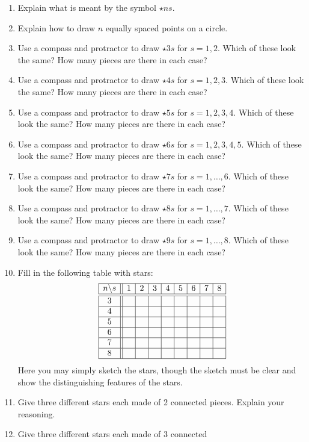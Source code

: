 \problems
\begin{enumerate}
\item Explain what is meant by the symbol $\star{n}{s}$.
\item Explain how to draw $n$ equally spaced points on a circle.
\item Use a compass and protractor to draw $\star{3}{s}$ for $s =
  1,2$. Which of these look the same?  How many pieces are there in
  each case?
\item Use a compass and protractor to draw $\star{4}{s}$ for $s =
  1,2,3$. Which of these look the same? How many pieces are there in
  each case?
\item Use a compass and protractor to draw $\star{5}{s}$ for $s =
  1,2,3,4$. Which of these look the same? How many pieces are there in
  each case?
\item Use a compass and protractor to draw $\star{6}{s}$ for $s =
  1,2,3,4,5$. Which of these look the same? How many pieces are there
  in each case?
\item Use a compass and protractor to draw $\star{7}{s}$ for $s =
  1,\dots,6$. Which of these look the same? How many pieces are there
  in each case?
\item Use a compass and protractor to draw $\star{8}{s}$ for $s =
  1,\dots,7$. Which of these look the same? How many pieces are there
  in each case?
\item Use a compass and protractor to draw $\star{9}{s}$ for $s =
  1,\dots,8$. Which of these look the same? How many pieces are there
  in each case?
\item Fill in the following table with stars: 
\[
\begin{array}{|c||c|c|c|c|c|c|c|c|}\hline
n\backslash s & 1 & 2 & 3 & 4 & 5 & 6 & 7 & 8 \\ \hline\hline
3 & & & & & & & & \\ \hline
4 & & & & & & & & \\ \hline
5 & & & & & & & & \\ \hline
6 & & & & & & & & \\ \hline
7 & & & & & & & & \\ \hline
8 & & & & & & & & \\ \hline
\end{array}
\]
Here you may simply sketch the stars, though the sketch must
be clear and show the distinguishing features of the stars.
\item Give three different stars each made of 2 connected
  pieces. Explain your reasoning.
\item Give three different stars each made of 3 connected

\end{enumerate}
